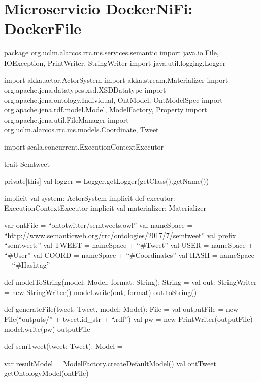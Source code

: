 \chapter{Microservicio DockerNiFi: DockerFile}
\label{chap:ms.semtweet}
\begin{listing}[
  language = scala,
  numbers=left,
  numberstyle=\tiny,
  stepnumber=5,
  numbersep=5pt,
  frame=single,
  caption  = {ms.semtweet: transformando tweet en triplas},
  label    = code:ms.semtweet]
package org.uclm.alarcos.rrc.ms.services.semantic
import java.io.{File, IOException, PrintWriter, StringWriter}
import java.util.logging.Logger

import akka.actor.ActorSystem
import akka.stream.Materializer
import org.apache.jena.datatypes.xsd.XSDDatatype
import org.apache.jena.ontology.{Individual, OntModel, OntModelSpec}
import org.apache.jena.rdf.model.{Model, ModelFactory, Property}
import org.apache.jena.util.FileManager
import org.uclm.alarcos.rrc.ms.models.{Coordinate, Tweet}

import scala.concurrent.ExecutionContextExecutor

trait Semtweet {

  private[this] val logger = Logger.getLogger(getClass().getName())

  implicit val system: ActorSystem
  implicit def executor: ExecutionContextExecutor
  implicit val materializer: Materializer

  var ontFile = ``ontotwitter/semtweets.owl''
  val nameSpace = ``http://www.semanticweb.org/rrc/ontologies/2017/7/semtweet''
  val prefix = ``semtweet:''
  val TWEET = nameSpace + ``#Tweet''
  val USER = nameSpace + ``#User''
  val COORD = nameSpace + ``#Coordinates''
  val HASH = nameSpace + ``#Hashtag''

  def modelToString(model: Model, format: String): String = {
    val out: StringWriter = new StringWriter()
    model.write(out, format)
    out.toString()
  }

  def generateFile(tweet: Tweet, model: Model): File = {
    val outputFile = new File(``outputs/'' + tweet.id_str + ``.rdf'')
    val pw = new PrintWriter(outputFile)
    model.write(pw)
    outputFile
  }

  def semTweet(tweet: Tweet): Model = {
    var resultModel = ModelFactory.createDefaultModel()
    val ontTweet  = getOntologyModel(ontFile)

}}
\end{listing}

